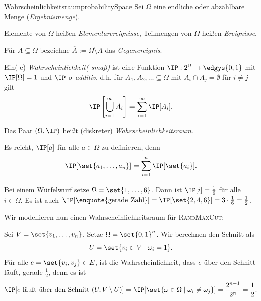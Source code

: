 \documentclass[language=ngerman,algolist]{TemplateLecture}
\begin{document}
\begin{defi}{Wahrscheinlichkeitsraum}{probabilitySpace}
    Sei $\Omega$ eine endliche oder abzählbare Menge (\emph{Ergebnismenge}). 
    
    Elemente von $\Omega$ heißen \emph{Elementarereignisse}, Teilmengen von $\Omega$ heißen \emph{Ereignisse}.

    Für $A \subseteq \Omega$ bezeichne $\overline{A} := \Omega \setminus A$ das \emph{Gegenereignis}.

    Ein(-e) \emph{Wahrscheinlichkeit(-smaß)} ist eine Funktion $\IP: 2^\Omega \to \edgys{0,1}$ mit $\IP[\Omega] = 1$ und $\IP$ \emph{$\sigma$-additiv}, d.h. für $A_1, A_2, \ldots \subseteq \Omega$ mit $A_i \cap A_j = \emptyset$ für $i \neq j$ gilt 
    \begin{equation*}
        \IP\left[ \bigcup_{i=1}^\infty A_i \right] = \sum_{i=1}^\infty \IP[A_i].
    \end{equation*}

    Das Paar $(\Omega, \IP)$ heißt (diskreter) \emph{Wahrscheinlichkeitsraum}.
\end{defi}

Es reicht, $\IP[a]$ für alle $a \in \Omega$ zu definieren, denn 
\begin{equation*}
    \IP[\set{a_1, \ldots, a_n}] = \sum_{i = 1}^n \IP[\set{a_i}].
\end{equation*}

\begin{expl}
    Bei einem Würfelwurf setze $\Omega = \set{1,\ldots, 6}$. Dann ist $\IP[i] = \frac{1}{6}$ für alle $i \in \Omega$. Es ist auch $\IP[\text{\enquote{gerade Zahl}}] = \IP[\set{2,4,6}] = 3 \cdot \frac{1}{6} = \frac{1}{2}$.
\end{expl}

Wir modellieren nun einen Wahrscheinlichkeitsraum für \textsc{RandMaxCut}:

Sei $V = \set{v_1, \ldots, v_n}$. Setze $\Omega = \set{0,1}^n$. Wir berechnen den Schnitt als 
\begin{equation*}
    U = \set{v_i \in V \mid \omega_i = 1}.
\end{equation*}
Für alle $e = \set{v_i, v_j} \in E$, ist die Wahrscheinlichkeit, dass $e$ über den Schnitt läuft, gerade $\frac{1}{2}$, denn es ist 
\begin{equation*}
    \IP[\text{$e$ läuft über den Schnitt $(U, V \setminus U)$}] = \IP[\set{\omega \in \Omega \mid \omega_i \neq \omega_j}] = \frac{2^{n-1}}{2^n} = \frac{1}{2}.
\end{equation*}
\end{document}
